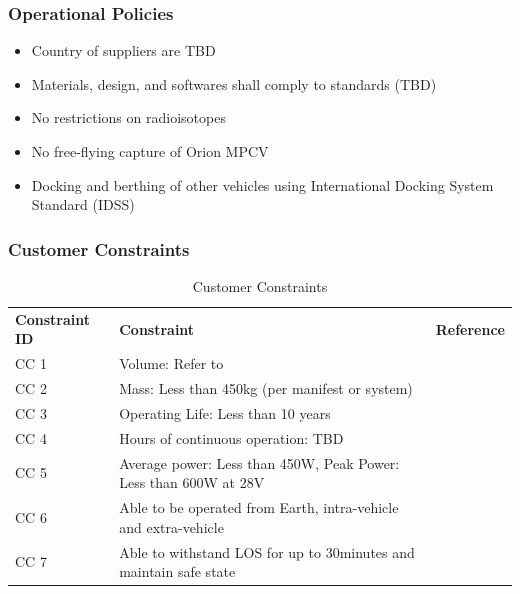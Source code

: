 \documentclass[12pt, letter]{article}
\begin{document}
\subsubsection{Operational Policies}
\begin{itemize}
\item{Country of suppliers are TBD}
\item{Materials, design, and softwares shall comply to standards (TBD)}
\item{No restrictions on radioisotopes}
\item{No free-flying capture of Orion MPCV}
\item{Docking and berthing of other vehicles using International Docking System Standard (IDSS)}
\end{itemize}
\subsubsection{Customer Constraints}
\begin{table}[H]
\label{cust_constraints}
\caption{Customer Constraints}
\centering
\begin{tabular}{|P{3cm}|P{10cm}|c|}
\hline
\textbf{Constraint ID}	&	\textbf{Constraint}										&	\textbf{Reference}	\\\hhline{|=|=|=|}
CC 1				&	Volume: Refer to 								&	\cite{RFP}			\\\hline
CC 2				&	Mass: Less than 450kg (per manifest or system)					&	\cite{RFP}			\\\hline
CC 3				&	Operating Life: Less than 10 years							&	\cite{RFP}			\\\hline
CC 4				&	Hours of continuous operation: TBD							&	\cite{RFP}			\\\hline
CC 5				&	Average power: Less than 450W, Peak Power: Less than 600W at 28V	&	\cite{RFP}			\\\hline
CC 6				&	Able to be operated from Earth, intra-vehicle and extra-vehicle		&	\cite{RFP}			\\\hline
CC 7				&	Able to withstand LOS for up to 30minutes and maintain safe state		&	\cite{RFP}			\\\hline
\end{tabular}
\end{table}
\end{document}
